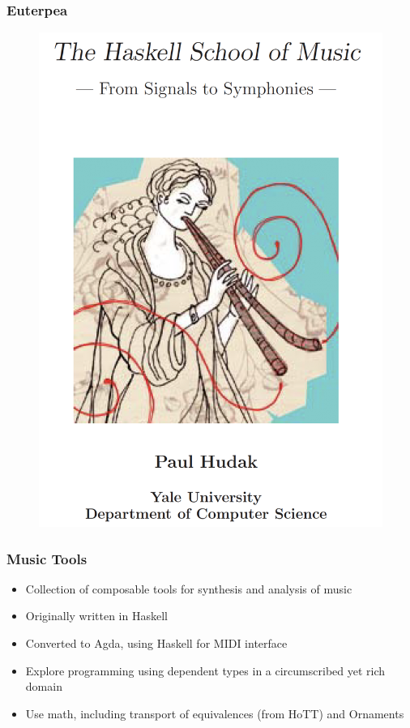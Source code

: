 \documentclass{beamer}
\begin{document}
\begin{frame}\frametitle{Euterpea}
\begin{figure}
\includegraphics[height=0.8\textheight]{hsom}
\end{figure}
\end{frame}

\begin{frame}\frametitle{Music Tools}
\begin{itemize}
\item Collection of composable tools for synthesis and analysis of music
\item Originally written in Haskell
\item Converted to Agda, using Haskell for MIDI interface
\item Explore programming using dependent types in a circumscribed yet rich domain
\item Use math, including transport of equivalences (from HoTT) and Ornaments
\end{itemize}
\end{frame}
\end{document}
